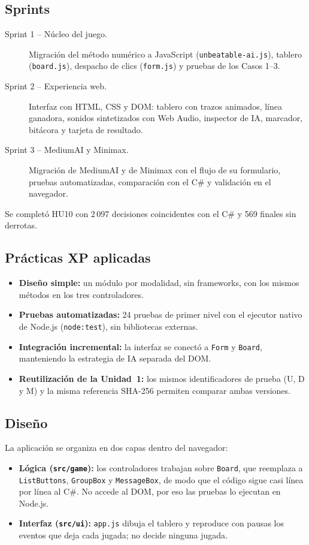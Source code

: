 \documentclass[12pt,a4paper]{article}
\begin{document}
\subsection{Sprints}
\begin{description}
  \item[Sprint 1 -- Núcleo del juego.] Migración del método numérico a JavaScript
        (\texttt{unbeatable-ai.js}), tablero (\texttt{board.js}), despacho de clics
        (\texttt{form.js}) y pruebas de los Casos 1--3.
  \item[Sprint 2 -- Experiencia web.] Interfaz con HTML, CSS y DOM: tablero con
        trazos animados, línea ganadora, sonidos sintetizados con Web Audio,
        inspector de IA, marcador, bitácora y tarjeta de resultado.
  \item[Sprint 3 -- MediumAI y Minimax.] Migración de MediumAI y de Minimax con el
        flujo de su formulario, pruebas automatizadas, comparación con el C\# y
        validación en el navegador.
\end{description}
Se completó HU10 con 2\,097 decisiones coincidentes con el C\# y 569 finales sin derrotas.

\subsection{Prácticas XP aplicadas}
\begin{itemize}
 \item \textbf{Diseño simple:} un módulo por modalidad, sin frameworks, con los
       mismos métodos en los tres controladores.
 \item \textbf{Pruebas automatizadas:} 24 pruebas de primer nivel con el ejecutor
       nativo de Node.js (\texttt{node:test}), sin bibliotecas externas.
 \item \textbf{Integración incremental:} la interfaz se conectó a \texttt{Form} y
       \texttt{Board}, manteniendo la estrategia de IA separada del DOM.
 \item \textbf{Reutilización de la Unidad~1:} los mismos identificadores de prueba
       (U, D y M) y la misma referencia SHA-256 permiten comparar ambas versiones.
\end{itemize}

\subsection{Diseño}
La aplicación se organiza en dos capas dentro del navegador:
\begin{itemize}
  \item \textbf{Lógica (\texttt{src/game}):} los controladores trabajan sobre
        \texttt{Board}, que reemplaza a \texttt{ListButtons}, \texttt{GroupBox} y
        \texttt{MessageBox}, de modo que el código sigue casi línea por línea al C\#.
        No accede al DOM, por eso las pruebas lo ejecutan en Node.js.
  \item \textbf{Interfaz (\texttt{src/ui}):} \texttt{app.js} dibuja el tablero y
        reproduce con pausas los eventos que deja cada jugada; no decide ninguna jugada.
\end{itemize}
\end{document}
